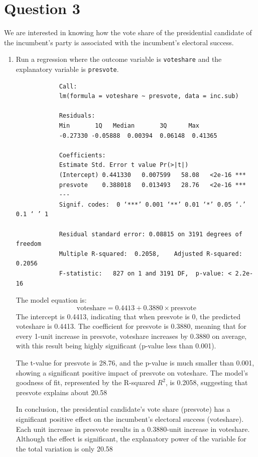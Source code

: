 \documentclass[12pt,letterpaper]{article}
\begin{document}
	\newpage	
\section*{Question 3}

\noindent We are interested in knowing how the vote share of the presidential candidate of the incumbent's party is associated with the incumbent's electoral success.
	\vspace{.25cm}
	\begin{enumerate}
		\item Run a regression where the outcome variable is \texttt{voteshare} and the explanatory variable is \texttt{presvote}.
		  
			\begin{verbatim}
			Call:
			lm(formula = voteshare ~ presvote, data = inc.sub)
			
			Residuals:
			Min       1Q   Median       3Q      Max 
			-0.27330 -0.05888  0.00394  0.06148  0.41365 
			
			Coefficients:
			Estimate Std. Error t value Pr(>|t|)    
			(Intercept) 0.441330   0.007599   58.08   <2e-16 ***
			presvote    0.388018   0.013493   28.76   <2e-16 ***
			---
			Signif. codes:  0 ‘***’ 0.001 ‘**’ 0.01 ‘*’ 0.05 ‘.’ 0.1 ‘ ’ 1
			
			Residual standard error: 0.08815 on 3191 degrees of freedom
			Multiple R-squared:  0.2058,	Adjusted R-squared:  0.2056 
			F-statistic:   827 on 1 and 3191 DF,  p-value: < 2.2e-16
		\end{verbatim} 
		  
		The model equation is:
		\[
		\text{voteshare} = 0.4413 + 0.3880 \times \text{presvote}
		\]
		The intercept is 0.4413, indicating that when presvote is 0, the predicted voteshare is 0.4413. The coefficient for presvote is 0.3880, meaning that for every 1-unit increase in presvote, voteshare increases by 0.3880 on average, with this result being highly significant (p-value less than 0.001).
		
		The t-value for presvote is 28.76, and the p-value is much smaller than 0.001, showing a significant positive impact of presvote on voteshare. The model’s goodness of fit, represented by the R-squared \( R^2 \), is 0.2058, suggesting that presvote explains about 20.58%
		
		In conclusion, the presidential candidate’s vote share (presvote) has a significant positive effect on the incumbent’s electoral success (voteshare). Each unit increase in presvote results in a 0.3880-unit increase in voteshare. Although the effect is significant, the explanatory power of the variable for the total variation is only 20.58%
		

\end{enumerate}
\end{document}
